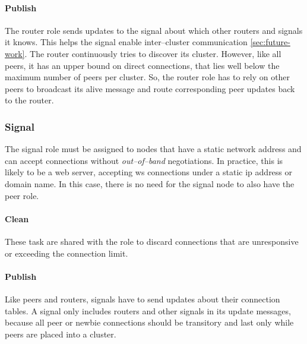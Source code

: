 \paragraph{Publish}
\begin{itemize}
     The router role sends updates to the signal about which other routers and signals it knows. This helps the signal enable inter–cluster communication \cref{sec:future-work}.
     The router continuously tries to discover its cluster. However, like all peers, it has an upper bound on direct connections, that lies well below the maximum number of peers per cluster. So, the router role has to rely on other peers to broadcast its alive message and route corresponding peer updates back to the router.
\end{itemize}

\subsubsection{Signal}\label{sec:design-roles-signal}
The signal role must be assigned to nodes that have a static network address and can accept connections without \textit{out–of–band} negotiations. In practice, this is likely to be a web server, accepting \gls{ws} connections under a static \gls{ip} address or domain name. In this case, there is no need for the signal node to also have the peer role.

\paragraph{Clean}
\begin{itemize}
     These task are shared with the \peerRole role to discard connections that are unresponsive or exceeding the connection limit.
\end{itemize}

\paragraph{Publish}
\begin{itemize}
     Like peers and routers, signals have to send updates about their connection tables. A signal only includes routers and other signals in its update messages, because all peer or newbie connections should be transitory and last only while peers are placed into a cluster.
\end{itemize}

